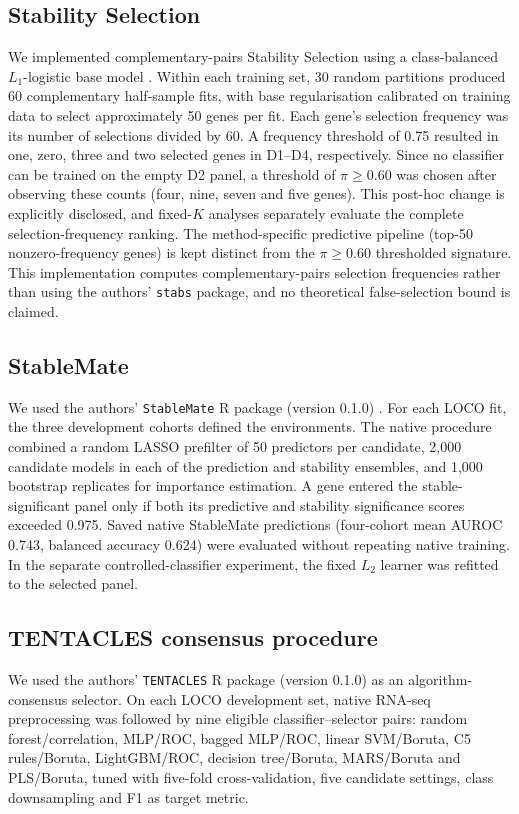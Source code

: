 \subsection{Stability Selection}
\label{sec:stability_method}
We implemented complementary-pairs Stability Selection using a class-balanced $L_1$-logistic base model \cite{meinshausen2010stability}. Within each training set, 30 random partitions produced 60 complementary half-sample fits, with base regularisation calibrated on training data to select approximately 50 genes per fit. Each gene's selection frequency was its number of selections divided by 60. A frequency threshold of 0.75 resulted in one, zero, three and two selected genes in D1--D4, respectively. Since no classifier can be trained on the empty D2 panel, a threshold of $\pi \ge 0.60$ was chosen after observing these counts (four, nine, seven and five genes). This post-hoc change is explicitly disclosed, and fixed-$K$ analyses separately evaluate the complete selection-frequency ranking. The method-specific predictive pipeline (top-50 nonzero-frequency genes) is kept distinct from the $\pi \ge 0.60$ thresholded signature. This implementation computes complementary-pairs selection frequencies rather than using the authors' \texttt{stabs} package, and no theoretical false-selection bound is claimed.

\subsection{StableMate}
\label{sec:stablemate_method}
We used the authors' \texttt{StableMate} R package (version 0.1.0) \cite{deng2024stablemate}. For each LOCO fit, the three development cohorts defined the environments. The native procedure combined a random LASSO prefilter of 50 predictors per candidate, 2,000 candidate models in each of the prediction and stability ensembles, and 1,000 bootstrap replicates for importance estimation. A gene entered the stable-significant panel only if both its predictive and stability significance scores exceeded 0.975. Saved native StableMate predictions (four-cohort mean AUROC 0.743, balanced accuracy 0.624) were evaluated without repeating native training. In the separate controlled-classifier experiment, the fixed $L_2$ learner was refitted to the selected panel.

\subsection{TENTACLES consensus procedure}
\label{sec:tentacles_method}
We used the authors' \texttt{TENTACLES} R package (version 0.1.0) \cite{montesi2026tentacles} as an algorithm-consensus selector. On each LOCO development set, native RNA-seq preprocessing was followed by nine eligible classifier--selector pairs: random forest/correlation, MLP/ROC, bagged MLP/ROC, linear SVM/Boruta, C5 rules/Boruta, LightGBM/ROC, decision tree/Boruta, MARS/Boruta and PLS/Boruta, tuned with five-fold cross-validation, five candidate settings, class downsampling and F1 as target metric.

